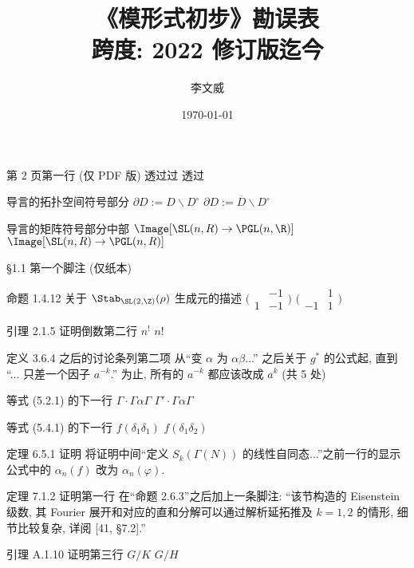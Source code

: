 \documentclass{AJerrata}
\title{\bfseries 《模形式初步》勘误表 \\ 跨度: 2022 修订版迄今}
\author{李文威}
\date{\today}
\begin{document}
	\maketitle
	
	\begin{Errata}
		\item[第 2 页第一行 (仅 PDF 版)]
		\Orig 透过过
		\Corr 透过
		
		\item[导言的拓扑空间符号部分]
		\Orig $\partial D := D \smallsetminus D^\circ$
		\Corr $\partial D := \overline{D} \smallsetminus D^\circ$
		
		\item[导言的矩阵符号部分中部]
		\Orig $\Image[\SL(n, R) \to \PGL(n, \R)]$
		\Corr $\Image[\SL(n, R) \to \PGL(n, R)]$
		
		\item[\S 1.1 第一个脚注 (仅纸本)]
		\Orig [50]
		\Corr [59]
		
		\item[命题 1.4.12 关于 $\Stab_{\SL(2, \Z)}(\rho)$ 生成元的描述]
		\Orig $\bigl(\begin{smallmatrix} & -1 \\ 1 & -1 \end{smallmatrix}\bigr)$
		\Corr $\bigl(\begin{smallmatrix} & 1 \\ -1 & 1 \end{smallmatrix}\bigr)$
		
		\item[引理 2.1.5 证明倒数第二行]
		\Orig $n^!$
		\Corr $n!$
		
		\item[定义 3.6.4 之后的讨论条列第二项]
		从``变 $\alpha$ 为 $\alpha\beta$...'' 之后关于 $g^*$ 的公式起, 直到 ``... 只差一个因子 $a^{-k}$.'' 为止, 所有的 $a^{-k}$ 都应该改成 $a^k$ (共 5 处)
		
		
		\item[等式 (5.2.1) 的下一行]
		\Orig $\Gamma \cdot \Gamma \alpha \Gamma$
		\Corr $\Gamma' \cdot \Gamma \alpha \Gamma$
		
		\item[等式 (5.4.1) 的下一行]
		\Orig $f(\delta_1 \delta_1)$
		\Corr $f(\delta_1 \delta_2)$
		
		\item[定理 6.5.1 证明]
		将证明中间``定义 $S_k(\Gamma(N))$ 的线性自同态...''之前一行的显示公式中的 $\alpha_n(f)$ 改为 $\alpha_n(\varphi)$.
		
		
		\item[定理 7.1.2 证明第一行]
		在``命题 2.6.3''之后加上一条脚注: ``该节构造的 Eisenstein 级数, 其 Fourier 展开和对应的直和分解可以通过解析延拓推及 $k = 1, 2$ 的情形, 细节比较复杂, 详阅 [41, \S 7.2].''
		
		
		\item[引理 A.1.10 证明第三行]
		\Orig $G/K$
		\Corr $G/H$
	\end{Errata}
\end{document}
